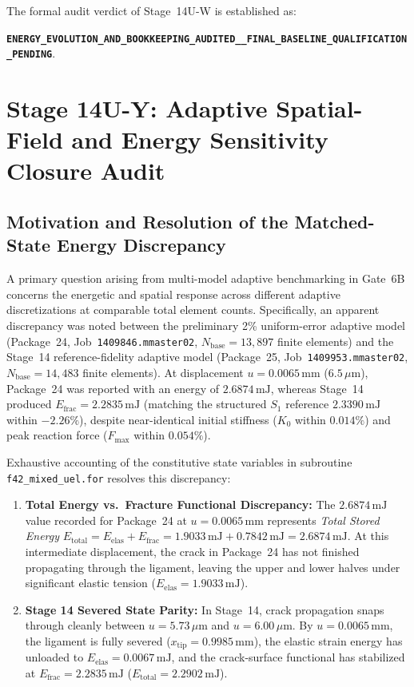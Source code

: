 The formal audit verdict of Stage~14U-W is established as:
\begin{center}
{\footnotesize\textbf{\texttt{ENERGY\_EVOLUTION\_AND\_BOOKKEEPING\_AUDITED\_\_FINAL\_BASELINE\_QUALIFICATION\_PENDING}}}.
\end{center}

\section{Stage 14U-Y: Adaptive Spatial-Field and Energy Sensitivity Closure Audit}
\label{sec:stage14uy_adaptive_spatial_energy_audit}

\subsection{Motivation and Resolution of the Matched-State Energy Discrepancy}
\label{subsec:stage14uy_discrepancy_resolution}

A primary question arising from multi-model adaptive benchmarking in Gate~6B concerns the energetic and spatial response across different adaptive discretizations at comparable total element counts. Specifically, an apparent discrepancy was noted between the preliminary 2\% uniform-error adaptive model (Package~24, Job~\texttt{1409846.mmaster02}, $N_{\mathrm{base}} = 13{,}897$ finite elements) and the Stage~14 reference-fidelity adaptive model (Package~25, Job~\texttt{1409953.mmaster02}, $N_{\mathrm{base}} = 14{,}483$ finite elements). At displacement $u = 0.0065\,\mathrm{mm}$ ($6.5\,\mu\mathrm{m}$), Package~24 was reported with an energy of $2.6874\,\mathrm{mJ}$, whereas Stage~14 produced $E_{\mathrm{frac}} = 2.2835\,\mathrm{mJ}$ (matching the structured $S_1$ reference $2.3390\,\mathrm{mJ}$ within $-2.26\%$), despite near-identical initial stiffness ($K_0$ within $0.014\%$) and peak reaction force ($F_{\max}$ within $0.054\%$).

Exhaustive accounting of the constitutive state variables in subroutine \texttt{f42\_mixed\_uel.for} resolves this discrepancy:
\begin{enumerate}
  \item \textbf{Total Energy vs.\ Fracture Functional Discrepancy:} The $2.6874\,\mathrm{mJ}$ value recorded for Package~24 at $u = 0.0065\,\mathrm{mm}$ represents \emph{Total Stored Energy} $E_{\mathrm{total}} = E_{\mathrm{elas}} + E_{\mathrm{frac}} = 1.9033\,\mathrm{mJ} + 0.7842\,\mathrm{mJ} = 2.6874\,\mathrm{mJ}$. At this intermediate displacement, the crack in Package~24 has not finished propagating through the ligament, leaving the upper and lower halves under significant elastic tension ($E_{\mathrm{elas}} = 1.9033\,\mathrm{mJ}$).
  \item \textbf{Stage 14 Severed State Parity:} In Stage~14, crack propagation snaps through cleanly between $u = 5.73\,\mu\mathrm{m}$ and $u = 6.00\,\mu\mathrm{m}$. By $u = 0.0065\,\mathrm{mm}$, the ligament is fully severed ($x_{\mathrm{tip}} = 0.9985\,\mathrm{mm}$), the elastic strain energy has unloaded to $E_{\mathrm{elas}} = 0.0067\,\mathrm{mJ}$, and the crack-surface functional has stabilized at $E_{\mathrm{frac}} = 2.2835\,\mathrm{mJ}$ ($E_{\mathrm{total}} = 2.2902\,\mathrm{mJ}$).
\end{enumerate}


